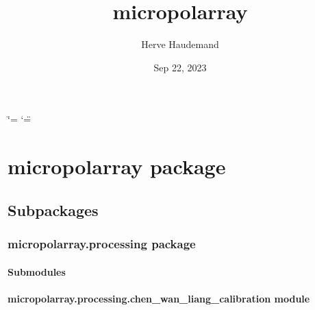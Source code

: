 \documentclass[letterpaper,10pt,english]{sphinxmanual}
\title{micropolarray}
\date{Sep 22, 2023}
\author{Herve Haudemand}
\begin{document}
\ifdefined\shorthandoff
  \ifnum\catcode`\=\string=\active\shorthandoff{=}\fi
  \ifnum\catcode`\"=\active{}\fi
\fi

\pagestyle{empty}
\sphinxmaketitle
\pagestyle{plain}
\sphinxtableofcontents
\pagestyle{normal}
\label{\detokenize{index::doc}}


\sphinxstepscope


\chapter{micropolarray package}
\label{\detokenize{micropolarray:micropolarray-package}}\label{\detokenize{micropolarray::doc}}

\section{Subpackages}
\label{\detokenize{micropolarray:subpackages}}
\sphinxstepscope


\subsection{micropolarray.processing package}
\label{\detokenize{micropolarray.processing:micropolarray-processing-package}}\label{\detokenize{micropolarray.processing::doc}}

\subsubsection{Submodules}
\label{\detokenize{micropolarray.processing:submodules}}

\subsubsection{micropolarray.processing.chen\_wan\_liang\_calibration module}
\label{\detokenize{micropolarray.processing:module-micropolarray.processing.chen_wan_liang_calibration}}\label{\detokenize{micropolarray.processing:micropolarray-processing-chen-wan-liang-calibration-module}}
\end{document}
